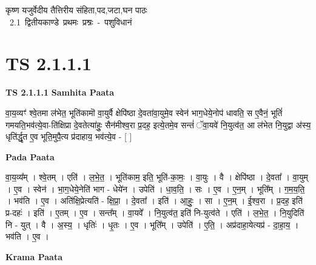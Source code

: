\documentclass[17pt]{extarticle}
\begin{document}
\begin{titlepage}
    \begin{center}
 
\begin{sanskrit}
    { \Huge
    कृष्ण यजुर्वेदीय तैत्तिरीय संहिता,पद,जटा,घन पाठः 
    }
    \\
    \vspace{2.5cm}
    \mbox{ \Huge
    2.1      द्वितीयकाण्डे  प्रथमः प्रश्नः - पशुविधानं   }
\end{sanskrit}
\end{center}

\end{titlepage}
\tableofcontents
\pagebreak

\section*{ TS 2.1.1.1 }

\textbf{TS 2.1.1.1 } \newline
\textbf{Samhita Paata} \newline

वा॒य॒व्यꣳ॑ श्वे॒तमा ल॑भेत॒ भूति॑कामॊ  वा॒युर्वै क्षेपि॑ष्ठा दे॒वता॑वा॒युमे॒व स्वेन॑ भाग॒धेये॒नोप॑ धावति॒ स ए॒वैनं॒ भूतिं॑ गमयति॒भव॑त्ये॒वा-ति॑क्षिप्रा दे॒वतेत्या॑हुः॒ सैन॑मीश्व॒रा प्र॒दह॒ इत्ये॒तमे॒व सन्तं॑ ॅवा॒यवे॑ नि॒युत्व॑त॒ आ ल॑भेत नि॒युद्वा अ॑स्य॒ धृति॑र्द्धृ॒त ए॒व भूति॒मुपै॒त्य प्र॑दाहाय॒ भव॑त्ये॒व - [  ] \newline

\textbf{Pada Paata} \newline

वा॒य॒व्य᳚म् । श्वे॒तम् । एति॑ । ल॒भे॒त॒ । भूति॑काम॒ इति॒ भूति॑-का॒मः॒ । वा॒युः । वै । क्षेपि॑ष्ठा । दे॒वता᳚ । वा॒युम् । ए॒व । स्वेन॑ । भा॒ग॒धेये॒नेति॑ भाग - धेये॑न । उपेति॑ । धा॒व॒ति॒ । सः । ए॒व । ए॒न॒म् । भूति᳚म् । ग॒म॒य॒ति॒ । भव॑ति । ए॒व । अति॑क्षि॒प्रेत्यति॑ - क्षि॒प्रा॒ । दे॒वता᳚ । इति॑ । आ॒हुः॒ । सा । ए॒न॒म् । ई॒श्व॒रा । प्र॒दह॒ इति॑ प्र-दहः॑ । इति॑ । ए॒तम् । ए॒व । सन्त᳚म् । वा॒यवे᳚ । नि॒युत्व॑त॒ इति॑ नि-युत्व॑ते । एति॑ । ल॒भे॒त॒ । नि॒युदिति॑ नि - युत् । वै । अ॒स्य॒ । धृतिः॑ । धृ॒तः । ए॒व । भूति᳚म् । उपेति॑ । ए॒ति॒ । अप्र॑दाहा॒येत्यप्र॑ - दा॒हा॒य॒ । भव॑ति । ए॒व ।  \newline


\textbf{Krama Paata} \newline
\end{document}
